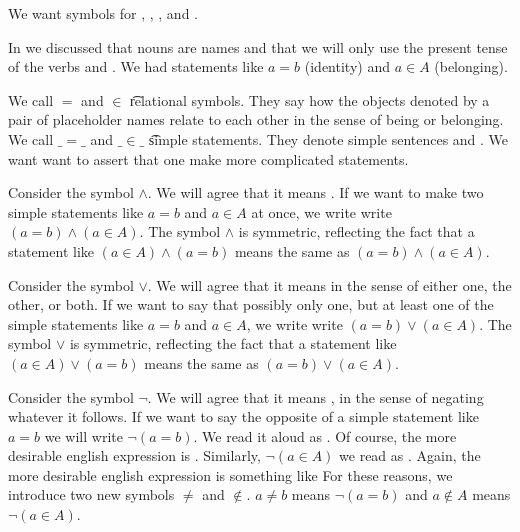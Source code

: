 

We want symbols for , , , and .


In  we discussed that nouns are names and that we will only use the present tense of the verbs  and .
We had statements like ${a}={b}$ (identity) and $a \in A$ (belonging).

We call $=$ and $\in$ \t{relational symbols}.
They say how the objects denoted by a pair of placeholder names relate to each other in the sense of being or belonging.
We call $\_=\_$ and $\_\in\_$ \t{simple statements}.
They denote simple sentences  and .
We want want to assert that one make more complicated statements.



Consider the symbol $\land$.
We will agree that it means .
If we want to make two simple statements like $a = b$ and $a \in A$ at once, we write write $(a = b) \land (a \in A)$.
The symbol $\land$ is symmetric, reflecting the fact that a statement like $(a \in A) \land (a = b)$ means the same as $(a = b) \land (a \in A)$.


Consider the symbol $\lor$.
We will agree that it means  in the sense of either one, the other, or both.
If we want to say that possibly only one, but at least one of the simple statements like $a = b$ and $a \in A$, we write write $(a = b) \lor (a \in A)$.
The symbol $\lor$ is symmetric, reflecting the fact that a statement like $(a \in A) \lor (a = b)$ means the same as $(a = b) \lor (a \in A)$.


Consider the symbol $\neg$.
We will agree that it means , in the sense of negating whatever it follows.
If we want to say the opposite of a simple statement like $a = b$ we will write $\neg(a = b)$.
We read it aloud as .
Of course, the more desirable english expression is .
Similarly, $\neg(a \in A)$ we read as .
Again, the more desirable english expression is something like 
For these reasons, we introduce two new symbols $\neq$ and $\not\in$.
$a \neq b$ means $\neg(a = b)$ and $a \not\in A$ means $\neg(a \in A)$.

